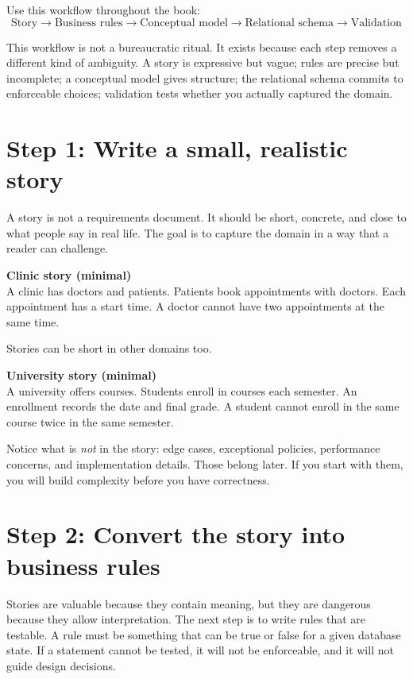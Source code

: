 \begin{principlebox}
Use this workflow throughout the book:
\[
\text{Story} \rightarrow \text{Business rules} \rightarrow \text{Conceptual model} \rightarrow
\text{Relational schema} \rightarrow \text{Validation}
\]
\end{principlebox}

This workflow is not a bureaucratic ritual.
It exists because each step removes a different kind of ambiguity.
A story is expressive but vague; rules are precise but incomplete; a conceptual model gives structure; the relational schema commits to enforceable choices; validation tests whether you actually captured the domain.

\section{Step 1: Write a small, realistic story}
A story is not a requirements document.
It should be short, concrete, and close to what people say in real life.
The goal is to capture the domain in a way that a reader can challenge.

\begin{examplebox}
\textbf{Clinic story (minimal)}\\
A clinic has doctors and patients.
Patients book appointments with doctors.
Each appointment has a start time.
A doctor cannot have two appointments at the same time.
\end{examplebox}

Stories can be short in other domains too.

\begin{examplebox}
\textbf{University story (minimal)}\\
A university offers courses.
Students enroll in courses each semester.
An enrollment records the date and final grade.
A student cannot enroll in the same course twice in the same semester.
\end{examplebox}

Notice what is \emph{not} in the story: edge cases, exceptional policies, performance concerns, and implementation details.
Those belong later.
If you start with them, you will build complexity before you have correctness.

\section{Step 2: Convert the story into business rules}
Stories are valuable because they contain meaning, but they are dangerous because they allow interpretation.
The next step is to write rules that are testable.
A rule must be something that can be true or false for a given database state.
If a statement cannot be tested, it will not be enforceable, and it will not guide design decisions.

